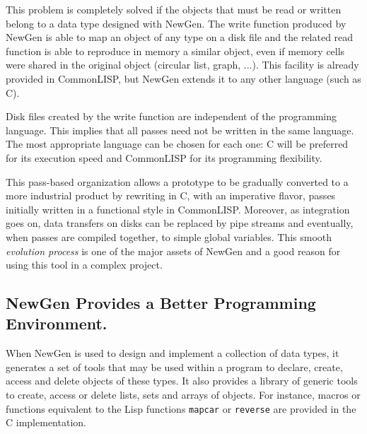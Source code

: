 This problem is completely solved if the objects that must be read or
written belong to a data type designed with NewGen. The write function
produced by NewGen is able to map an object of any type on a disk file
and the related read function is able to reproduce in memory a similar
object, even if memory cells were shared in the original object
(circular list, graph, ...). This facility is already provided in
CommonLISP, but NewGen extends it to any other language (such as C).

Disk files created by the write function are independent of the
programming language. This implies that all passes need not be written
in the same language. The most appropriate language can be chosen for
each one: C will be preferred for its execution speed and CommonLISP for
its programming flexibility. 

This pass-based organization allows a prototype to be gradually
converted to a more industrial product by rewriting in C, with an
imperative flavor, passes initially written in a functional style in
CommonLISP.  Moreover, as integration goes on, data transfers on disks
can be replaced by pipe streams and eventually, when passes are compiled
together, to simple global variables. This smooth {\em evolution
process} is one of the major assets of NewGen and a good reason for
using this tool in a complex project.

\subsection*{NewGen Provides a Better Programming Environment.}

When NewGen is used to design and implement a collection of data types,
it generates a set of tools that may be used within a program to
declare, create, access and delete objects of these types. It also
provides a library of generic tools to create, access or delete lists,
sets and arrays of objects. For instance, macros or functions equivalent
to the Lisp functions {\tt mapcar} or {\tt reverse} are provided in the
C implementation.

